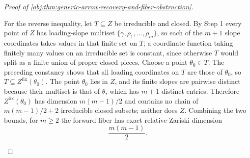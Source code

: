 \begin{proof}[Proof of \cref{obj:thm:generic-arrow-recovery-and-fiber-obstruction}]
\begin{enumerate}
For the reverse inequality, let \(T\subseteq Z\) be irreducible and closed.  By Step 1 every point of \(Z\) has loading-slope multiset \(\{\gamma,\rho_1,\ldots,\rho_m\}\), so each of the \(m+1\) slope coordinates takes values in that finite set on \(T\); a coordinate function taking finitely many values on an irreducible set is constant, since otherwise \(T\) would split as a finite union of proper closed pieces.  Choose a point \(\theta_0\in T\).  The preceding constancy shows that all loading coordinates on \(T\) are those of \(\theta_0\), so \(T\subseteq Z^{\mathrm{fix}}(\theta_0)\).  The point \(\theta_0\) lies in \(Z\), and its finite slopes are pairwise distinct because their multiset is that of \(\theta\), which has \(m+1\) distinct entries.  Therefore \(Z^{\mathrm{fix}}(\theta_0)\) has dimension \(m(m-1)/2\) and contains no chain of \(m(m-1)/2+2\) irreducible closed subsets; neither does \(Z\).  Combining the two bounds, for \(m\ge2\) the forward fiber has exact relative Zariski dimension
\[
\frac{m(m-1)}{2}.
\]


\end{enumerate}
\end{proof}
